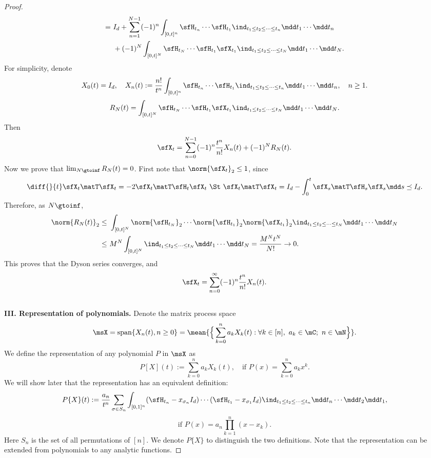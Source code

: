 \documentclass[11pt]{article}
\begin{document}
\begin{proof}
\begin{align*}
    =~& I_d + \sum_{n=1}^{N-1} (-1)^n \int_{[0,t]^n} \sfH_{t_n} \cdots \sfH_{t_1} \ind_{t_1\le t_2 \le \cdots \le t_n} \mdd t_1 \cdots \mdd t_n \\
    & + (-1)^N \int_{[0,t]^N} \sfH_{t_N} \cdots \sfH_{t_1} \sfX_{t_1} \ind_{t_1\le t_2 \le \cdots \le t_N} \mdd t_1 \cdots \mdd t_N.
\end{align*}
For simplicity, denote 
\[
    X_0(t) = I_d, \quad X_n(t)  := \frac{n!}{t^n} \int_{[0,t]^n} \sfH_{t_n} \cdots \sfH_{t_1} \ind_{t_1\le t_2 \le \cdots \le t_n} \mdd t_1 \cdots \mdd t_n, \quad n \ge 1.
\]
\[
    R_N(t) = \int_{[0,t]^N} \sfH_{t_N} \cdots \sfH_{t_1} \sfX_{t_1} \ind_{t_1\le t_2 \le \cdots \le t_N} \mdd t_1 \cdots \mdd t_N.
\]
Then 
\[
    \sfX_t = \sum_{n=0}^{N-1} (-1)^n \frac{t^n}{n!} X_n(t)+(-1)^N R_N(t).
\]
Now we prove that $\lim_{N\gtoinf} R_N(t) = 0$. First note that $\norm{\sfX_t}_2 \le 1$, since
\[
    \diff{}{t} \sfX_t\matT \sfX_t = - 2 \sfX_t\matT \sfH_t \sfX_t ~\St~ \sfX_t\matT \sfX_t = I_d - \int_0^t \sfX_s\matT \sfH_s \sfX_s \mdd s \preceq I_d.
\]
Therefore, as $N\gtoinf$,
\begin{align*}
    \norm{R_N(t)}_2 \le~& \int_{[0,t]^N} \norm{\sfH_{t_N}}_2 \cdots \norm{\sfH_{t_1}}_2 \norm{\sfX_{t_1}}_2 \ind_{t_1\le t_2 \le \cdots \le t_N} \mdd t_1 \cdots \mdd t_N \\
    \le~& M^N \int_{[0,t]^N} \ind_{t_1\le t_2 \le \cdots \le t_N} \mdd t_1 \cdots \mdd t_N = \frac{M^N t^N}{N!} \to 0. 
\end{align*}
This proves that the Dyson series converges, and
\[
    \sfX_t = \sum_{n=0}^\infty (-1)^n \frac{t^n}{n!} X_n(t).
\]
%
\ \\
%
{\bf III. Representation of polynomials.}
Denote the matrix process space 
\[
    \msX = \text{span}\{X_n(t), n\ge 0\} = \mean{ \Big\{ \sum_{k=0}^n a_k X_k(t) : \forall k \in [n],~ a_k\in\mC;~ n \in \mN \Big\} }.
\]
We define the representation of any polynomial $P$ in $\msX$ as 
\[
    P[X](t) := \sum_{k=0}^n a_k X_k(t), \quad \text{if } P(x) = \sum_{k=0}^n a_k x^k.
\]
We will show later that the representation has an equivalent definition:
\begin{equation}
\label{eqn:poly_rep}
    P\{X\}(t) := \frac{a_n}{t^n} \sum_{\sigma \in S_n} \int_{[0,1]^n} (\sfH_{t_n} - x_{\sigma_n} I_d) \cdots (\sfH_{t_1} - x_{\sigma_1} I_d) \ind_{t_1\le t_2 \le \cdots \le t_n} \mdd t_n \cdots \mdd t_2 \mdd t_1,
\end{equation}
\[
    \text{if } P(x) = a_n \prod_{k=1}^n (x-x_k).
\]
Here $S_n$ is the set of all permutations of $[n]$.
We denote $P\{X\}$ to distinguish the two definitions. Note that the representation can be extended from polynomials to any analytic functions.

\end{proof}
\end{document}
